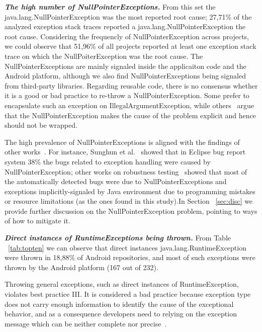 \documentclass[conference]{IEEEtran}
\begin{document}
\emph{\textbf{The high number of NullPointerExceptions.}}
From this set the java.lang.NullPointerException was the most reported root cause; 27,71\% 
of the analyzed exception stack traces reported a java.lang.NullPointerException the root cause. 
Considering the frequencly of NullPointerException across projects, we could observe that
 51,96\% of all projects reported at least one exception stack trace on which the NullPoiterException
was the root cause.
 The NullPointerExceptions are mainly signaled inside the applicaiton code and the Android platform,
 although we also find NullPointerExceptions being signaled from third-party libraries. Regarding
reusable code, there is no consensus whether it is a good or bad practice to 
re-throw a NullPointerException. Some prefer to encapsulate such an exception on
IllegalArgumentException, while others~\cite{bloch2008effective} argue that the
NullPointerException makes the cause of the problem explicit and hence 
should not be wrapped.

The high prevalence of NullPointerExceptions is aligned with the findings of other 
works~\cite{kim2013predicting,fraser20131600,csallner2004jcrasher}. For instance, Sunghun et
al.~\cite{kim2013predicting} showed that in Eclipse bug report system 38\% the bugs 
related to exception handling were caused by NullPointerException; other works on robustness 
testing~\cite{maji2012empirical,csallner2004jcrasher} showed that most of the automatically 
detected bugs were due to NullPointerExceptions 
and exceptions implicitly-signaled by Java environment due to programming mistakes or resource limitations
 (as the ones found in this study).In Section ~\ref{sec:disc}  we provide further 
discussion on the NullPointerException problem, pointing 
to ways of how to mitigate it.

\emph{\textbf{Direct instances of RuntimeExceptions being thrown.}}
From Table ~\ref{tab:topten} we can observe that direct instances
java.lang.RuntimeException were thrown in 18,88\% of Android repositories, and
most of such exceptions  were  thrown by the Android platform (167 out of 232).

Throwing general exceptions, such as direct instances of RuntimeException, violates best
practice III. It is considered a bad practice because exception type does not carry enough
 information to identify the cause of the exceptional behavior, and as a consequence developers need to relying on
the exception message which can be neither complete nor precise~\cite{gosling2000java}.
\end{document}
